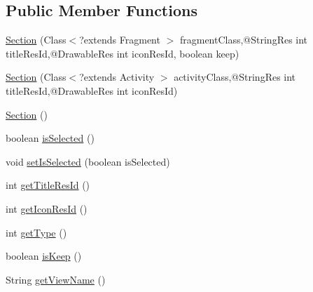\subsection*{Public Member Functions}
\begin{DoxyCompactItemize}
\item 
\hyperlink{enumorg_1_1buildmlearn_1_1toolkit_1_1model_1_1Section_af8fb689a6421ec67519ee10df7ed87d9}{Section} (Class$<$?extends Fragment $>$ fragment\-Class,@String\-Res int title\-Res\-Id,@Drawable\-Res int icon\-Res\-Id, boolean keep)
\item 
\hyperlink{enumorg_1_1buildmlearn_1_1toolkit_1_1model_1_1Section_a07baca773badd3aad114bc1dbe9ac81b}{Section} (Class$<$?extends Activity $>$ activity\-Class,@String\-Res int title\-Res\-Id,@Drawable\-Res int icon\-Res\-Id)
\item 
\hyperlink{enumorg_1_1buildmlearn_1_1toolkit_1_1model_1_1Section_a061a1024b9dad8b98f087318b07c25ec}{Section} ()
\item 
boolean \hyperlink{enumorg_1_1buildmlearn_1_1toolkit_1_1model_1_1Section_a4cb0beec9f29165abfcbc67fde005f88}{is\-Selected} ()
\item 
void \hyperlink{enumorg_1_1buildmlearn_1_1toolkit_1_1model_1_1Section_aa51797a0f1021e6c5a5782c7518334eb}{set\-Is\-Selected} (boolean is\-Selected)
\item 
int \hyperlink{enumorg_1_1buildmlearn_1_1toolkit_1_1model_1_1Section_af9f688dd7dff001f5175eed3c1b95332}{get\-Title\-Res\-Id} ()
\item 
int \hyperlink{enumorg_1_1buildmlearn_1_1toolkit_1_1model_1_1Section_aba7bab2bf37269948e22e2a785e753a5}{get\-Icon\-Res\-Id} ()
\item 
int \hyperlink{enumorg_1_1buildmlearn_1_1toolkit_1_1model_1_1Section_a6d0fa18c1e8ae4a33eb54acced5cfc16}{get\-Type} ()
\item 
boolean \hyperlink{enumorg_1_1buildmlearn_1_1toolkit_1_1model_1_1Section_ae9b75c2d499a28b4aa0ee59fa73810f2}{is\-Keep} ()
\item 
String \hyperlink{enumorg_1_1buildmlearn_1_1toolkit_1_1model_1_1Section_a9f3eae353cb3049fca5b6ad5628db129}{get\-View\-Name} ()
\end{DoxyCompactItemize}
